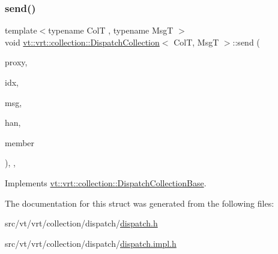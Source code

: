 \subsubsection{\texorpdfstring{send()}{send()}}
{\footnotesize\ttfamily template$<$typename ColT , typename MsgT $>$ \\
void \hyperlink{structvt_1_1vrt_1_1collection_1_1_dispatch_collection}{vt\+::vrt\+::collection\+::\+Dispatch\+Collection}$<$ ColT, MsgT $>$\+::send (\begin{DoxyParamCaption}\item[{\hyperlink{namespacevt_a1b417dd5d684f045bb58a0ede70045ac}{Virtual\+Proxy\+Type}}]{proxy,  }\item[{void $\ast$}]{idx,  }\item[{void $\ast$}]{msg,  }\item[{\hyperlink{namespacevt_af64846b57dfcaf104da3ef6967917573}{Handler\+Type}}]{han,  }\item[{bool}]{member }\end{DoxyParamCaption})\hspace{0.3cm}{\ttfamily [override]}, {\ttfamily [private]}, {\ttfamily [virtual]}}



Implements \hyperlink{structvt_1_1vrt_1_1collection_1_1_dispatch_collection_base_a207db071c213e894568a8b7ff217cd58}{vt\+::vrt\+::collection\+::\+Dispatch\+Collection\+Base}.



The documentation for this struct was generated from the following files\+:\begin{DoxyCompactItemize}
\item 
src/vt/vrt/collection/dispatch/\hyperlink{vrt_2collection_2dispatch_2dispatch_8h}{dispatch.\+h}\item 
src/vt/vrt/collection/dispatch/\hyperlink{vrt_2collection_2dispatch_2dispatch_8impl_8h}{dispatch.\+impl.\+h}\end{DoxyCompactItemize}
